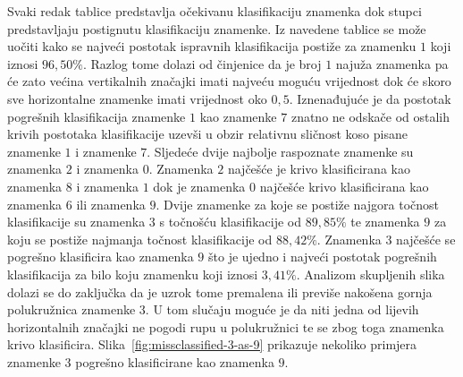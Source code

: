 Svaki redak tablice predstavlja očekivanu klasifikaciju znamenka dok stupci predstavljaju postignutu klasifikaciju
znamenke. Iz navedene tablice se može uočiti kako se najveći postotak ispravnih klasifikacija postiže za znamenku $1$
koji iznosi $96,50\%$. Razlog tome dolazi od činjenice da je broj $1$ najuža znamenka pa će zato većina vertikalnih
značajki imati najveću moguću vrijednost dok će skoro sve horizontalne znamenke imati vrijednost oko $0,5$. Iznenađujuće
je da postotak pogrešnih klasifikacija znamenke $1$ kao znamenke $7$ znatno ne odskače od ostalih krivih postotaka
klasifikacije uzevši u obzir relativnu sličnost koso pisane znamenke $1$ i znamenke $7$. Sljedeće dvije najbolje
raspoznate znamenke su znamenka $2$ i znamenka $0$. Znamenka $2$ najčešće je krivo klasificirana kao znamenka $8$ i
znamenka $1$ dok je znamenka $0$ najčešće krivo klasificirana kao znamenka $6$ ili znamenka $9$. Dvije znamenke za koje
se postiže najgora točnost klasifikacije su znamenka $3$ s točnošću klasifikacije od $89,85\%$ te znamenka $9$ za koju
se postiže najmanja točnost klasifikacije od $88,42\%$. Znamenka $3$ najčešće se pogrešno klasificira kao znamenka $9$
što je ujedno i najveći postotak pogrešnih klasifikacija za bilo koju znamenku koji iznosi $3,41\%$. Analizom
skupljenih slika dolazi se do zaključka da je uzrok tome premalena ili previše nakošena gornja polukružnica znamenke
$3$. U tom slučaju moguće je da niti jedna od lijevih horizontalnih značajki ne pogodi rupu u polukružnici te se zbog
toga znamenka krivo klasificira. Slika\ \ref{fig:missclassified-3-as-9} prikazuje nekoliko primjera znamenke $3$
pogrešno klasificirane kao znamenka $9$.
